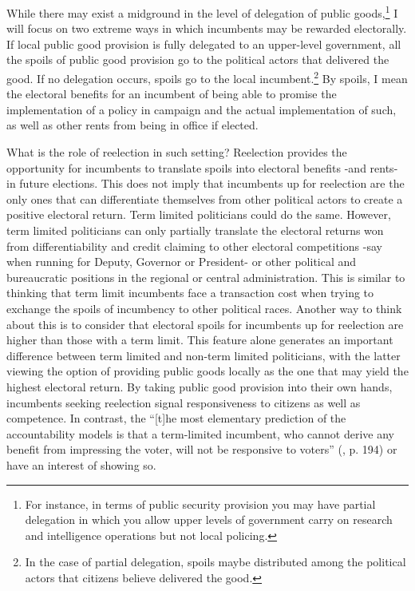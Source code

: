 \documentclass[12pt]{amsart}
\numberwithin{equation}{section}
\theoremstyle{definition}
\theoremstyle{definition}
\theoremstyle{definition}
\begin{document}

While there may exist a midground in the level of delegation of public goods,\footnote{For instance, in terms of public security provision you may have partial delegation in which you allow upper levels of government carry on research and intelligence operations but not local policing.} I will focus on two extreme ways in which incumbents may be rewarded electorally. If local public good provision is fully delegated to an upper-level government, all the spoils of public good provision go to the political actors that delivered the good. If no delegation occurs, spoils go to the local incumbent.\footnote{In the case of partial delegation, spoils maybe distributed among the political actors that citizens believe delivered the good.} By spoils, I mean the electoral benefits for an incumbent of being able to promise the implementation of a policy in campaign and the actual implementation of such, as well as other rents from being in office if elected. 

What is the role of reelection in such setting? Reelection provides the opportunity for incumbents to translate spoils into electoral benefits -and rents- in future elections. This does not imply that incumbents up for reelection are the only ones that can differentiate themselves from other political actors to create a positive electoral return. Term limited politicians could do the same. However, term limited politicians can only partially translate the electoral returns won from differentiability and credit claiming to other electoral competitions -say when running for Deputy, Governor or President- or other political and bureaucratic positions in the regional or central administration. This is similar to thinking that term limit incumbents face a transaction cost when trying to exchange the spoils of incumbency to other political races. Another way to think about this is to consider that electoral spoils for incumbents up for reelection are higher than those with a term limit. This feature alone generates an important difference between term limited and non-term limited politicians, with the latter viewing the option of providing public goods locally as the one that may yield the highest electoral return. By taking public good provision into their own hands, incumbents seeking reelection signal responsiveness to citizens as well as competence. In contrast, the ``[t]he most elementary prediction of the accountability models is that a term-limited incumbent, who cannot derive any benefit from impressing the voter, will not be responsive to voters” (\citet{ashworth_2012}, p. 194) or have an interest of showing so.
\end{document}
